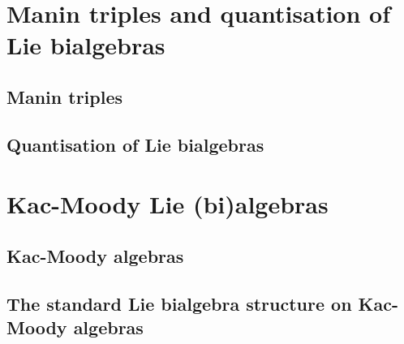     \begin{appendices}
        \section{Manin triples and quantisation of Lie bialgebras} 
            \subsection{Manin triples} \label{subsection: manin_triples}
                

            \subsection{Quantisation of Lie bialgebras}
                
    
        \section{Kac-Moody Lie (bi)algebras}
            \subsection{Kac-Moody algebras} \label{subsection: setup_kac_moody_algebras}
                

            \subsection{The standard Lie bialgebra structure on Kac-Moody algebras} \label{subsection: setup_standard_kac_moody_lie_bialgebras}
                
    \end{appendices}
	
    \printbibliography

